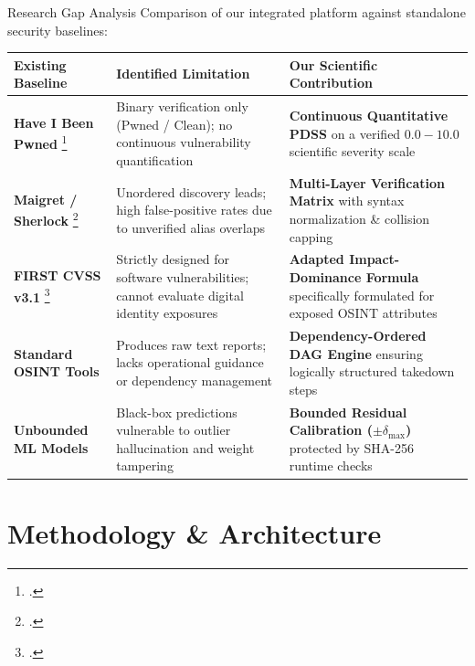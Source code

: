 \documentclass[aspectratio=169,10pt]{beamer}
\begin{document}
\begin{frame}{Research Gap Analysis}
  \footnotesize
  Comparison of our integrated platform against standalone security baselines:
  
  \vspace{0.15cm}
  \begin{table}
    \centering
    \scriptsize
    \begin{tabular}{>{\raggedright\arraybackslash}p{2.3cm} >{\raggedright\arraybackslash}p{3.7cm} >{\raggedright\arraybackslash}p{4.8cm}}
      \toprule
      \textbf{Existing Baseline} & \textbf{Identified Limitation} & \textbf{Our Scientific Contribution} \\
      \midrule
      \textbf{Have I Been Pwned} \footcite{hibp2025} & Binary verification only (Pwned / Clean); no continuous vulnerability quantification & \textbf{Continuous Quantitative PDSS} on a verified $0.0 - 10.0$ scientific severity scale \\
      \textbf{Maigret / Sherlock} \footcite{soxoj2020maigret, dushantha2018sherlock} & Unordered discovery leads; high false-positive rates due to unverified alias overlaps & \textbf{Multi-Layer Verification Matrix} with syntax normalization \& collision capping \\
      \textbf{FIRST CVSS v3.1} \footcite{cvss2019} & Strictly designed for software vulnerabilities; cannot evaluate digital identity exposures & \textbf{Adapted Impact-Dominance Formula} specifically formulated for exposed OSINT attributes \\
      \textbf{Standard OSINT Tools} & Produces raw text reports; lacks operational guidance or dependency management & \textbf{Dependency-Ordered DAG Engine} ensuring logically structured takedown steps \\
      \textbf{Unbounded ML Models} & Black-box predictions vulnerable to outlier hallucination and weight tampering & \textbf{Bounded Residual Calibration ($\pm \delta_{\text{max}}$)} protected by SHA-256 runtime checks \\
      \bottomrule
    \end{tabular}
  \end{table}
\end{frame}

\section{Methodology \& Architecture}
\end{document}
